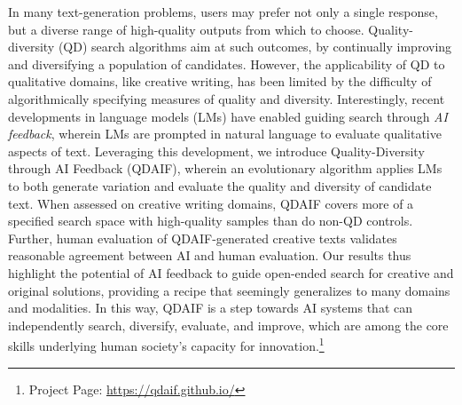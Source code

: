In many text-generation problems, users may prefer not only a single response, but a diverse range of high-quality outputs from which to choose. Quality-diversity (QD) search algorithms aim at such outcomes, by continually improving and diversifying a population of candidates. However, the applicability of QD to qualitative domains, like creative writing, has been limited by the difficulty of algorithmically specifying measures of quality and diversity. Interestingly, recent developments in language models (LMs) have enabled guiding search through \emph{AI feedback}, wherein LMs are prompted in natural language to evaluate qualitative aspects of text. Leveraging this development, we introduce Quality-Diversity through AI Feedback (QDAIF), wherein an evolutionary algorithm applies LMs to both generate variation and evaluate the quality and diversity of candidate text. When assessed on creative writing domains, QDAIF covers more of a specified search space with high-quality samples than do non-QD controls. Further, human evaluation of QDAIF-generated creative texts validates reasonable agreement between AI and human evaluation. Our results thus highlight the potential of AI feedback to guide open-ended search for creative and original solutions, providing a recipe that seemingly generalizes to many domains and modalities. In this way, QDAIF is a step towards AI systems that can independently search, diversify, evaluate, and improve, which are among the core skills underlying human society's capacity for innovation.\footnote[1]{Project Page: \url{https://qdaif.github.io/}}


